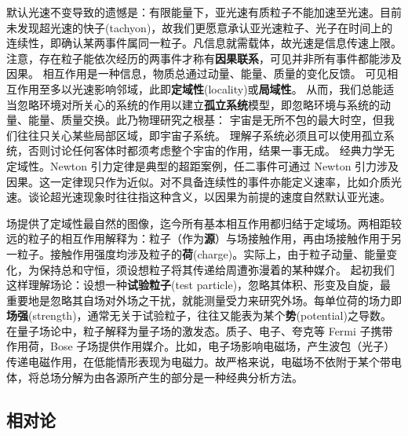 默认光速不变导致的遗憾是：有限能量下，亚光速有质粒子不能加速至光速。目前未发现超光速的快子(tachyon)，故我们更愿意承认亚光速粒子、光子在时间上的连续性，即确认某两事件属同一粒子。凡信息就需载体，故光速是信息传速上限。注意，存在粒子能依次经历的两事件才称有\textbf{因果联系}，可见并非所有事件都能涉及因果。
相互作用是一种信息，物质总通过动量、能量、质量的变化反馈。
可见相互作用至多以光速影响邻域，此即\textbf{定域性}(locality)或\textbf{局域性}。
从而，我们总能适当忽略环境对所关心的系统的作用以建立\textbf{孤立系统}模型，即忽略环境与系统的动量、能量、质量交换。此乃物理研究之根基：
宇宙是无所不包的最大时空，但我们往往只关心某些局部区域，即宇宙子系统。
理解子系统必须且可以使用孤立系统，否则讨论任何客体时都须考虑整个宇宙的作用，结果一事无成。
经典力学无定域性。Newton 引力定律是典型的超距案例，任二事件可通过 Newton 引力涉及因果。这一定律现只作为近似。对不具备连续性的事件亦能定义速率，比如介质光速。谈论超光速现象时往往指这种含义，以因果为前提的速度自然默认亚光速。

场提供了定域性最自然的图像，迄今所有基本相互作⽤都归结于定域场。两相距较远的粒子的相互作⽤解释为：粒子（作为\textbf{源}）与场接触作用，再由场接触作用于另一粒子。接触作用强度均涉及粒子的\textbf{荷}(charge)。实际上，由于粒子动量、能量变化，为保持总和守恒，须设想粒子将其传递给周遭弥漫着的某种媒介。
起初我们这样理解场论：设想一种\textbf{试验粒子}(test particle)，忽略其体积、形变及自旋，最重要地是忽略其自场对外场之干扰，就能测量受力来研究外场。每单位荷的场力即\textbf{场强}(strength)，通常无关于试验粒子，往往又能表为某个\textbf{势}(potential)之导数。
在量子场论中，粒子解释为量子场的激发态。质子、电子、夸克等 Fermi 子携带作用荷，Bose 子场提供作用媒介。比如，电子场影响电磁场，产生波包（光子）传递电磁作用，在低能情形表现为电磁力。故严格来说，电磁场不依附于某个带电体，将总场分解为由各源所产生的部分是一种经典分析方法。

\subsection{相对论}

